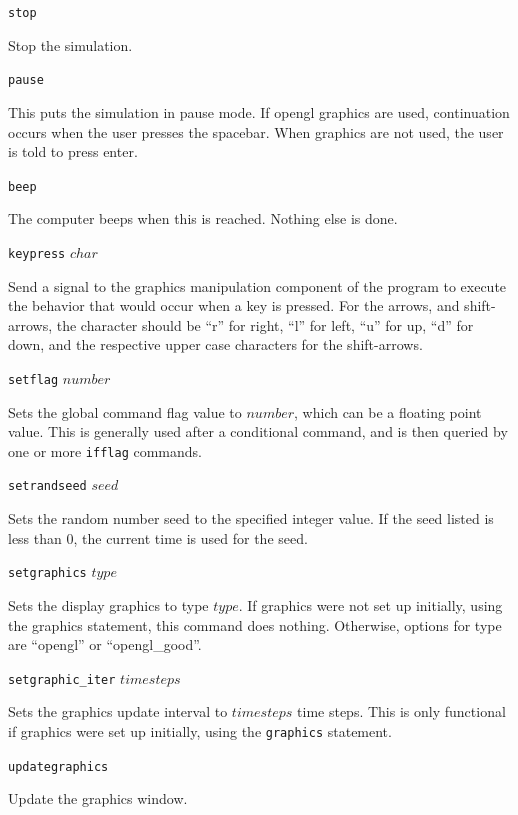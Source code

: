 \documentclass {book}
\newcommand {\ttt} {\texttt}
\begin{document}
\begin{description}

\item{\ttt{stop}}

Stop the simulation.

\item{\ttt{pause}}

This puts the simulation in pause mode. If opengl graphics are used, continuation occurs when the user presses the spacebar. When graphics are not used, the user is told to press enter.

\item{\ttt{beep}}

The computer beeps when this is reached. Nothing else is done.

\item{\ttt{keypress} $char$}

Send a signal to the graphics manipulation component of the program to execute the behavior that would occur when a key is pressed. For the arrows, and shift-arrows, the character should be ``r'' for right, ``l'' for left, ``u'' for up, ``d'' for down, and the respective upper case characters for the shift-arrows.

\item{\ttt{setflag} $number$}

Sets the global command flag value to $number$, which can be a floating point value. This is generally used after a conditional command, and is then queried by one or more \ttt{ifflag} commands.

\item{\ttt{setrandseed} $seed$}

Sets the random number seed to the specified integer value. If the seed listed is less than 0, the current time is used for the seed.

\item{\ttt{setgraphics} $type$}

Sets the display graphics to type $type$. If graphics were not set up initially, using the graphics statement, this command does nothing. Otherwise, options for type are ``opengl'' or ``opengl\_good''.

\item{\ttt{setgraphic\_iter} $timesteps$}

Sets the graphics update interval to $timesteps$ time steps. This is only functional if graphics were set up initially, using the \ttt{graphics} statement.

\item{\ttt{updategraphics}}

Update the graphics window.

\end{description}
\end{document}
